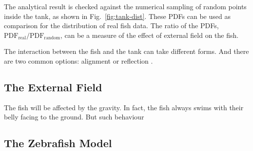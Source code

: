 \documentclass[11pt,twoside]{report}
\begin{document}
\noindent The analytical result is checked against the numerical sampling of random points inside the tank, as shown in Fig.\ \ref{fig:tank-dist}. These PDFs can be used as comparison for the distribution of real fish data. The ratio of the PDFs, $\textrm{PDF}_\textrm{real} / \textrm{PDF}_\textrm{random}$, can be a measure of the effect of external field on the fish.

The interaction between the fish and the tank can take different forms. And there are two common options: alignment or reflection \cite{martinez2018}.

\subsection{The External Field}

The fish will be affected by the gravity. In fact, the fish always swims with their belly facing to the ground. But such behaviour 

\subsection{The Zebrafish Model}
\end{document}
